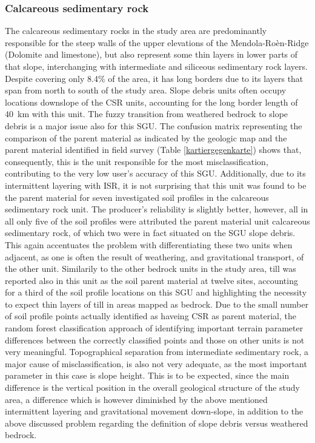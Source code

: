 \documentclass[preprint,12pt,authoryear]{elsarticle}
\begin{document}
\subsubsection{Calcareous sedimentary rock}
The calcareous sedimentary rocks in the study area are predominantly  responsible for the steep walls of the upper elevations of the  Mendola-Ro\`en-Ridge (Dolomite and limestone), but also represent some thin layers in lower parts of that slope, interchanging with intermediate and siliceous sedimentary rock layers. Despite covering only 8.4\% of the area, it has long borders due to its layers that span from north to south of the study area. Slope debris units often occupy locations downslope of the CSR units, accounting for the long  border length of 40~km with this unit. The fuzzy transition from weathered bedrock to slope debris is a major issue also for this SGU. The confusion matrix representing the comparison of the parent material as indicated by the geologic map and the parent material identified in field survey (Table \ref{kartiergegenkarte}) shows that, consequently, this is the unit responsible for the most misclassification, contributing to the very low user's accuracy of this SGU. Additionally, due to its intermittent layering with ISR, it is not surprising that this unit was found to be the parent material for seven investigated soil profiles in the calcareous sedimentary rock unit. The producer's reliability is slightly better, however, all in all only five of the soil profiles were attributed the parent material unit calcareous sedimentary rock, of which two were in fact situated on the SGU slope debris. This again accentuates the problem with differentiating these two units when adjacent, as one is often the result of weathering, and gravitational transport, of the other unit. Similarily to the other bedrock units in the study area, till was reported also in this unit as the soil parent material at twelve sites, accounting for a third of the soil profile locations on this SGU and highlighting the necessity to expect thin layers of till in areas mapped as bedrock. Due to the small number of soil profile points actually identified as haveing CSR as parent material, the random forest classification approach of identifying important terrain parameter differences between the correctly classified points and those on other units is not very meaningful. Topographical separation from intermediate sedimentary rock, a major cause of misclassification, is also not very adequate, as the most important parameter in this case is slope height. This is to be expected, since the main difference is the vertical position in the overall geological structure of the study area, a difference which is however diminished by the above mentioned intermittent layering and gravitational movement down-slope, in addition to the above discussed problem regarding the definition of slope debris versus weathered bedrock.
\end{document}
